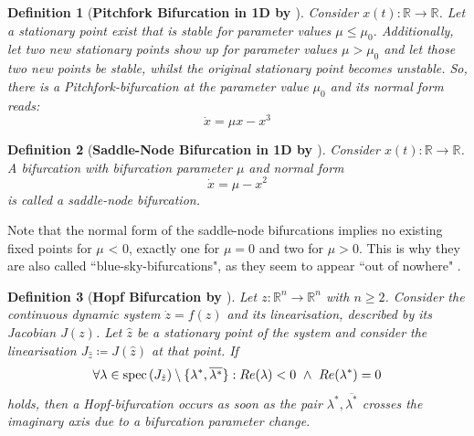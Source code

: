 \documentclass[12pt,a4paper,twoside]{article}
\newtheorem{definition}{Definition}[section]
\begin{document}
\begin{definition}[\textbf{Pitchfork Bifurcation in 1D by \cite{Muller2015}}]
	Consider $x(t): \mathbb{R} \rightarrow \mathbb{R}$. Let a stationary point exist that is stable for parameter values $\mu \leq \mu_0$. Additionally, let two new stationary points show up for parameter values $\mu  > \mu_0$ and let those two new points be stable, whilst the original stationary point becomes unstable. So, there is a Pitchfork-bifurcation at the parameter value $\mu_0$ and its normal form reads:
	\begin{equation}\label{def:pitchfork_bifu_1D}
		\dot{x} = \mu x - x^3
	\end{equation}
\end{definition}

\begin{definition}[\textbf{Saddle-Node Bifurcation in 1D by \cite{Muller2015}}]
		Consider $x(t): \mathbb{R} \rightarrow \mathbb{R}$. A bifurcation with bifurcation parameter $\mu$ and normal form
	\begin{equation}\label{def:saddle-node_bifu_1D}
	\dot{x} = \mu - x^2
	\end{equation}
	is called a saddle-node bifurcation.
\end{definition}

Note that the normal form of the saddle-node bifurcations implies no existing fixed points for $\mu$ < 0, exactly one for $\mu = 0$ and two for $\mu > 0$. This is why they are also called ``blue-sky-bifurcations", as they seem to appear ``out of nowhere" \cite{Muller2015}.

\begin{definition}[\textbf{Hopf Bifurcation by \cite{Hale1991}}]\label{def:hopf_bifurcation}
	Let $z: \mathbb{R}^n \rightarrow \mathbb{R}^n$ with $n \geq 2$. Consider the continuous dynamic system $\dot{z} = f(z)$ and its linearisation, described by its Jacobian $J(z)$. Let $\hat{z}$ be a stationary point of the system and consider the linearisation $J_{\hat{z}} \coloneqq J(\hat{z})$ at that point. If
	\begin{equation*}
		\forall \lambda \in \mathrm{spec}\left(J_{\hat{z}}\right)\setminus \lbrace \lambda^*, \overline{\lambda^*}\rbrace : Re(\lambda) < 0\textnormal{   } \land \textnormal{   } Re(\lambda^*) = 0
	\end{equation*}
	holds, then a Hopf-bifurcation occurs as soon as the pair $\lambda^*, \overline{\lambda^*}$ crosses the imaginary axis due to a bifurcation parameter change.
\end{definition}
\end{document}
